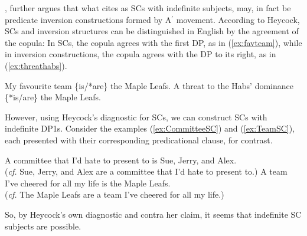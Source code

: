 \documentclass[
	letterpaper,
]{article}
\begin{document}
%
%
%
%
\textcite{heycock2012specification}, further argues that what \textcite{mikkelsen2005copular} cites as SCs with indefinite subjects, may, in fact be predicate inversion constructions formed by A$^{\prime}$ movement.
According to Heycock, SCs and inversion structures can be distinguished in English by the agreement of the copula:
In SCs, the copula agrees with the first DP, as in (\ref{ex:favteam}), while in inversion constructions, the copula agrees with the DP to its right, as in (\ref{ex:threathabs}).
\begin{exe}
	\ex My favourite team \{is/*are\} the Maple Leafs.\label{ex:favteam}
	\ex A threat to the Habs' dominance \{*is/are\} the Maple Leafs.\label{ex:threathabs}
\end{exe}
However, using Heycock's diagnostic for SCs, we can construct SCs with indefinite DP1s.
Consider the examples (\ref{ex:CommitteeSC}) and (\ref{ex:TeamSC}), each presented with their corresponding predicational clause, for contrast.
\begin{exe}
	\ex\label{ex:CommitteeSC} A committee that I'd hate to present to is Sue, Jerry, and Alex.\\
(\textit{cf.} Sue, Jerry, and Alex are a committee that I'd hate to present to.)
	\ex\label{ex:TeamSC} A team I've cheered for all my life is the Maple Leafs.\\
(\textit{cf.} The Maple Leafs are a team I've cheered for all my life.)
\end{exe}
So, by Heycock's own diagnostic and contra her claim, it seems that indefinite SC subjects are possible.
\end{document}
